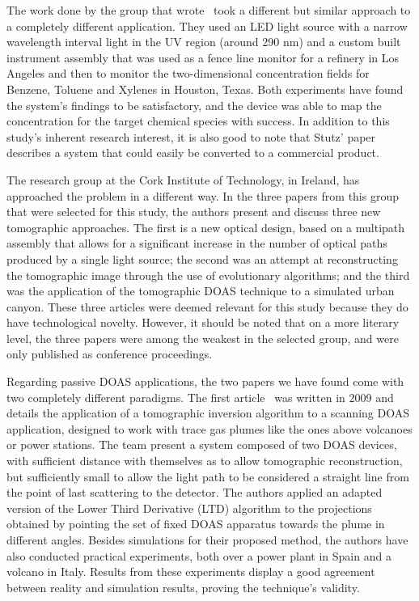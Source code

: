 The work done by the group that wrote~\cite{Stutz2016} took a different
but similar approach to a completely different application. They used an
LED light source with a narrow wavelength interval light in the UV
region (around 290 nm) and a custom built instrument assembly that was
used as a fence line monitor for a refinery in Los Angeles and then to
monitor the two-dimensional concentration fields for Benzene, Toluene
and Xylenes in Houston, Texas. Both experiments have found the system's
findings to be satisfactory, and the device was able to map the
concentration for the target chemical species with success. In addition
to this study's inherent research interest, it is also good to note that
Stutz' paper describes a system that could easily be converted to a
commercial product.

The research group at the Cork Institute of Technology, in Ireland, has
approached the problem in a different way. In the three papers from this
group~\cite{Murphy2003, ODriscoll2003, ODriscoll2003a} that were
selected for this study, the authors present and discuss three new
tomographic approaches. The first is a new optical design, based on a
multipath assembly that allows for a significant increase in the number
of optical paths produced by a single light source; the second was an
attempt at reconstructing the tomographic image through the use of
evolutionary algorithms; and the third was the application of the
tomographic DOAS technique to a simulated urban canyon. These three
articles were deemed relevant for this study because they do have
technological novelty. However, it should be noted that on a more
literary level, the three papers were among the weakest in the selected
group, and were only published as conference proceedings.


Regarding passive DOAS applications, the two papers we have found come
with two completely different paradigms. The first
article~\cite{Johansson2009} was written in 2009 and details the
application of a tomographic inversion algorithm to a scanning DOAS
application, designed to work with trace gas plumes like the ones above
volcanoes or power stations. The team present a system composed of two
DOAS devices, with sufficient distance with themselves as to allow
tomographic reconstruction, but sufficiently small to allow the light
path to be considered a straight line from the point of last scattering
to the detector. The authors applied an adapted version of the Lower
Third Derivative (LTD) algorithm to the projections obtained by pointing
the set of fixed DOAS apparatus towards the plume in different angles.
Besides simulations for their proposed method, the authors have also
conducted practical experiments, both over a power plant in Spain and a
volcano in Italy. Results from these experiments display a good
agreement between reality and simulation results, proving the
technique's validity.

